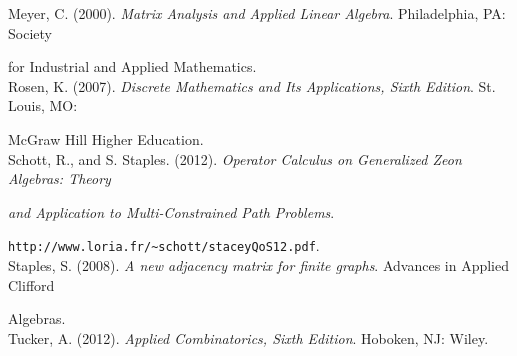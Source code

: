 \documentclass[12pt]{amsart}
\theoremstyle{definition}
\theoremstyle{remark}
\numberwithin{equation}{section}
\begin{document}
\noindent Meyer, C. (2000). \emph{Matrix Analysis and Applied Linear Algebra}. Philadelphia, PA: Society

for Industrial and Applied Mathematics. \\

\noindent Rosen, K. (2007). \emph{Discrete Mathematics and Its Applications, Sixth Edition}. St. Louis, MO:

McGraw Hill Higher Education. \\

\noindent Schott, R., and S. Staples. (2012). \emph{Operator Calculus on Generalized Zeon Algebras: Theory}

\emph{and Application to Multi-Constrained Path Problems}.

\verb+http://www.loria.fr/~schott/staceyQoS12.pdf+. \\

\noindent Staples, S. (2008). \emph{A new adjacency matrix for finite graphs}. Advances in Applied Clifford

Algebras. \\

\noindent Tucker, A. (2012). \emph{Applied Combinatorics, Sixth Edition}. Hoboken, NJ: Wiley. \\
\end{document}
